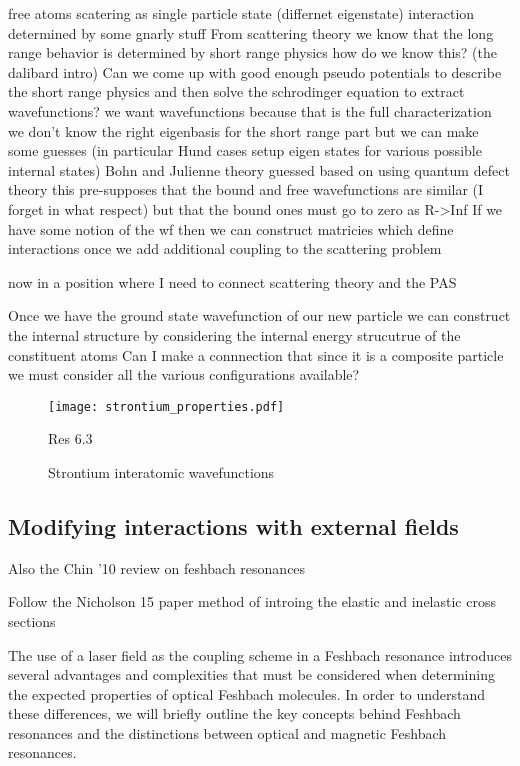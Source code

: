 free atoms
scatering as single particle state (differnet eigenstate)
	interaction determined by some gnarly stuff
From scattering theory we know that the long range behavior is determined by short range physics
	how do we know this? (the dalibard intro)
Can we come up with good enough pseudo potentials to describe the short range physics and then solve the schrodinger equation to extract wavefunctions?
	we want wavefunctions because that is the full characterization
	we don't know the right eigenbasis for the short range part but we can make some guesses (in particular Hund cases setup eigen states for various possible internal states)
	Bohn and Julienne theory guessed based on using quantum defect theory
		this pre-supposes that the bound and free wavefunctions are similar (I forget in what respect) but that the bound ones must go to zero as R->Inf
If we have some notion of the wf then we can construct matricies which define interactions once we add additional coupling to the scattering problem


now in a position where I need to connect scattering theory and the PAS


Once we have the ground state wavefunction of our new particle we can construct the internal structure by considering the internal energy strucutrue of the constituent atoms
	Can I make a connnection that since it is a composite particle we must consider all the various configurations available?
	
\begin{figure} \label{fig:ch3_sr_scat_wf}
	\centerline{
	\texttt{[image: strontium\_properties.pdf]}}
	\caption{Strontium interatomic wavefunctions}{Res 6.3}
\end{figure} 

\subsection{Modifying interactions with external fields} \label{ssec:mod_int}

Also the Chin '10 review on feshbach resonances

Follow the Nicholson 15 paper method of introing the elastic and inelastic cross sections

The use of a laser field as the coupling scheme in a Feshbach resonance introduces several advantages and complexities that must be considered when determining the expected properties of optical Feshbach molecules. In order to understand these differences, we will briefly outline the key concepts behind Feshbach resonances and the distinctions between optical and magnetic Feshbach resonances.


